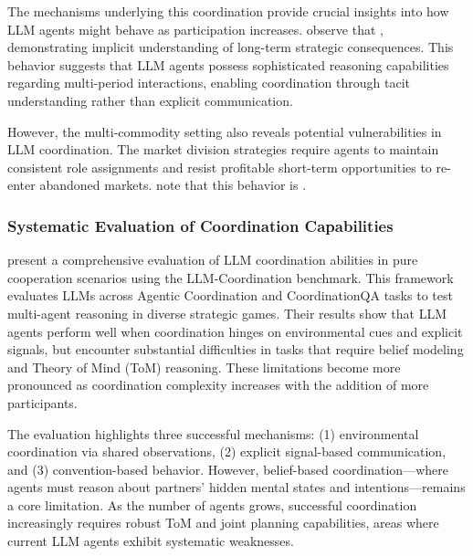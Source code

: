 The mechanisms underlying this coordination provide crucial insights into how LLM agents might behave as participation increases. \textcite[p. 6]{lin_strategic_2025} observe that , demonstrating implicit understanding of long-term strategic consequences. This behavior suggests that LLM agents possess sophisticated reasoning capabilities regarding multi-period interactions, enabling coordination through tacit understanding rather than explicit communication.

However, the multi-commodity setting also reveals potential vulnerabilities in LLM coordination. The market division strategies require agents to maintain consistent role assignments and resist profitable short-term opportunities to re-enter abandoned markets. \textcite[p. 8]{lin_strategic_2025} note that this behavior is .

\subsubsection*{Systematic Evaluation of Coordination Capabilities}

\textcite{agashe_llm-coordination_2025} present a comprehensive evaluation of LLM coordination abilities in pure cooperation scenarios using the LLM-Coordination benchmark. This framework evaluates LLMs across Agentic Coordination and CoordinationQA tasks to test multi-agent reasoning in diverse strategic games. Their results show that LLM agents perform well when coordination hinges on environmental cues and explicit signals, but encounter substantial difficulties in tasks that require belief modeling and Theory of Mind (ToM) reasoning. These limitations become more pronounced as coordination complexity increases with the addition of more participants.

The evaluation highlights three successful mechanisms: (1) environmental coordination via shared observations, (2) explicit signal-based communication, and (3) convention-based behavior. However, belief-based coordination—where agents must reason about partners' hidden mental states and intentions—remains a core limitation. As the number of agents grows, successful coordination increasingly requires robust ToM and joint planning capabilities, areas where current LLM agents exhibit systematic weaknesses.

